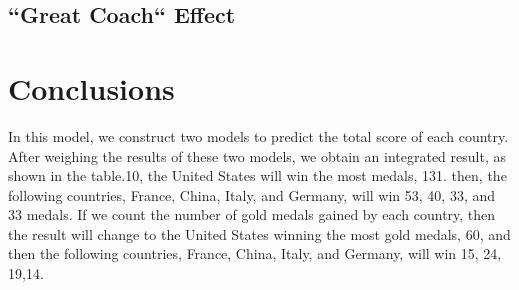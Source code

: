 \documentclass{mcmthesis}
\begin{document}
\subsection{``Great Coach`` Effect}

\section{Conclusions}
In this model, we construct two models to predict the total score of each country. After weighing the results of these two models, we obtain an integrated result, as shown in the table.10, the United States will win the most medals, 131. then, the following countries, France, China, Italy, and Germany, will win 53, 40, 33, and 33 medals. If we count the number of gold medals gained by each country, then the result will change to the United States winning the most gold medals, 60, and then the following countries, France, China, Italy, and Germany, will win 15, 24, 19,14.
\end{document}
